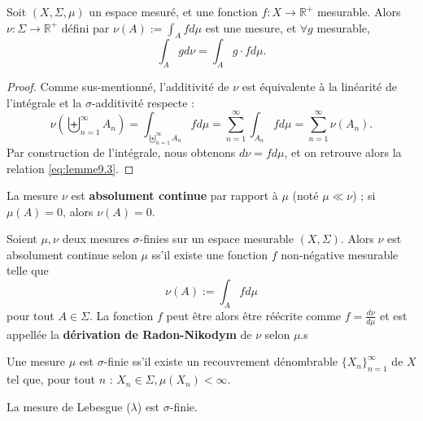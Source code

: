 \begin{lemme}
    Soit $(X,\Sigma,\mu)$ un espace mesuré, et une fonction $f:X\to\mathbb{R}^+$ mesurable. Alors $\nu : \Sigma\to\mathbb{R}^+$ défini par $\nu(A):=\int_A f d\mu$ est une mesure, et $\forall g$ mesurable,
    \begin{equation}
        \int_A g d\nu = \int_A g\cdot f d\mu.
        \label{eq:lemme9.3}
    \end{equation}
\end{lemme}
\begin{proof}
    Comme sus-mentionné, l'additivité de $\nu$ est équivalente à la linéarité de l'intégrale et la $\sigma$-additivité respecte :
    \begin{equation*}
        \nu\left(\biguplus_{n=1}^\infty A_n\right) = \int_{\biguplus_{n=1}^\infty A_n} f d\mu = \sum_{n=1}^\infty \int_{A_n} f d\mu = \sum_{n=1}^\infty \nu(A_n).
    \end{equation*}
    Par construction de l'intégrale, nous obtenons $d\nu = f d\mu$, et on retrouve alors la relation \ref{eq:lemme9.3}.
\end{proof}

\begin{definition}
    La mesure $\nu$ est \textbf{absolument continue} par rapport à $\mu$ (noté $\mu\ll\nu$) ; si $\mu(A)=0$, alors $\nu(A)=0$.
\end{definition}

\begin{theo}
    Soient $\mu,\nu$ deux mesures $\sigma$-finies sur un espace mesurable $(X,\Sigma)$. Alors $\nu$ est absolument continue selon $\mu$ ss'il existe une fonction $f$ non-négative mesurable telle que
    \begin{equation}
        \nu(A) := \int_A f d\mu
    \end{equation}
    pour tout $A\in\Sigma$. La fonction $f$ peut être alors être réécrite comme $f=\frac{d\nu}{d\mu}$ et est appellée la \textbf{dérivation de Radon-Nikodym} de $\nu$ selon $\mu$.s
\end{theo}

\begin{remark}
    Une mesure $\mu$ est $\sigma$-finie ss'il existe un recouvrement dénombrable $\{X_n\}_{n=1}^\infty$ de $X$ tel que, pour tout $n$ : $X_n\in\Sigma, \mu(X_n)<\infty$.
\end{remark}

\begin{remark}
    La mesure de Lebesgue ($\lambda$) est $\sigma$-finie.
\end{remark}

